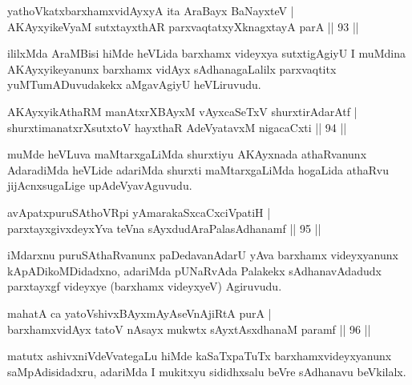 \begin{shl}
yathoVkatxbarxhamxvidAyxyA ita AraBayx BaNayxteV |\\
AKAyxyikeVyaM sutxtayxthAR parxvaqtatxyXknagxtayA parA \hfill || 93 ||
\end{shl}

\begin{artha}
ililxMda AraMBisi hiMde heVLida barxhamx videyxya sutxtigAgiyU I muMdina AKAyxyikeyanunx barxhamx vidAyx sAdhanagaLalilx parxvaqtitx yuMTumADuvudakekx aMgavAgiyU heVLiruvudu.
\end{artha}


\begin{shl}
AKAyxyikAthaRM manAtxrXBAyxM vAyxcaSeTxV shurxtirAdarAtf |\\
shurxtimanatxrXsutxtoV hayxthaR AdeVyatavxM nigacaCxti \hfill || 94 ||
\end{shl}

\begin{artha}
muMde heVLuva maMtarxgaLiMda shurxtiyu AKAyxnada athaRvanunx AdaradiMda heVLide adariMda shurxti maMtarxgaLiMda hogaLida athaRvu jijAcnxsugaLige upAdeVyavAguvudu.
\end{artha}


\begin{shl}
avApatxpuruSAthoVR\s pi yAmarakaSxcaCxciVpatiH |\\
parxtayxgivxdeyxYva teVna sAyxdudAraPalasAdhanamf \hfill || 95 ||
\end{shl}

\begin{artha}
iMdarxnu puruSAthaRvanunx paDedavanAdarU yAva barxhamx videyxyanunx kApADikoMDidadxno, adariMda pUNaRvAda Palakekx sAdhanavAdadudx parxtayxgf videyxye (barxhamx videyxyeV) Agiruvudu.
\end{artha}

\begin{shl}
mahatA ca yatoV\s shivxBAyxmAyAseVnAjiRtA purA |\\
barxhamxvidAyx tatoV nAsayx mukwtx sAyxtAsxdhanaM paramf \hfill || 96 ||
\end{shl}

\begin{artha}
matutx ashivxniVdeVvategaLu hiMde kaSaTxpaTuTx barxhamxvideyxyanunx saMpAdisidadxru, adariMda I mukitxyu sididhxsalu beVre sAdhanavu beVkilalx.
\end{artha}


